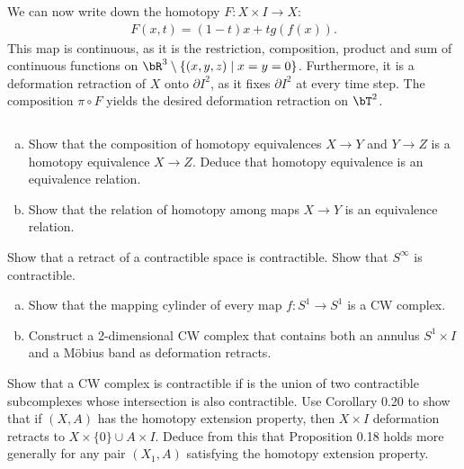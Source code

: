 \begin{homework}[e]
\begin{prf}
		We can now write down the homotopy $F:X \times I \to X$:
		\begin{align*}
			F(x,t) = (1 - t)x + tg(f(x)).
		\end{align*}
		This map is continuous, as it is the restriction, composition, product and sum of continuous functions on $\bR^3 \setminus \{(x,y,z) \mid x = y = 0\}$. Furthermore, it is a deformation retraction of $X$ onto $\partial I^2$, as it fixes $\partial I^2$ at every time step. The composition $\pi \circ F$ yields the desired deformation retraction on $\bT^2$.
	\end{prf}

	\prob $ $
	\begin{enumerate}[(a)]
		\item Show that the composition of homotopy equivalences $X\to Y$ and $Y\to Z$ is a homotopy equivalence $X\to Z$. Deduce that homotopy equivalence is an equivalence relation.
		\item Show that the relation of homotopy among maps $X \to Y$ is an equivalence relation.
	\end{enumerate}

	\prob Show that a retract of a contractible space is contractible.
	\prob Show that $S^\infty$ is contractible.
	\prob $ $
	\begin{enumerate}[(a)]
		\item Show that the mapping cylinder of every map $f:S^1 \to S^1$ is a CW complex.
		\item Construct a 2-dimensional CW complex that contains both an annulus $S^1\times I$ and a M\"obius band as deformation retracts.
	\end{enumerate}
	\prob Show that a CW complex is contractible if is the union of two contractible subcomplexes whose intersection is also contractible.
	\prob Use Corollary 0.20 to show that if $(X,A)$ has the homotopy extension property, then $X\times I$ deformation retracts to $X\times \{0\}\cup A\times I$. Deduce from this that Proposition 0.18 holds more generally for any pair $(X_1,A)$ satisfying the homotopy extension property.
\end{homework}


